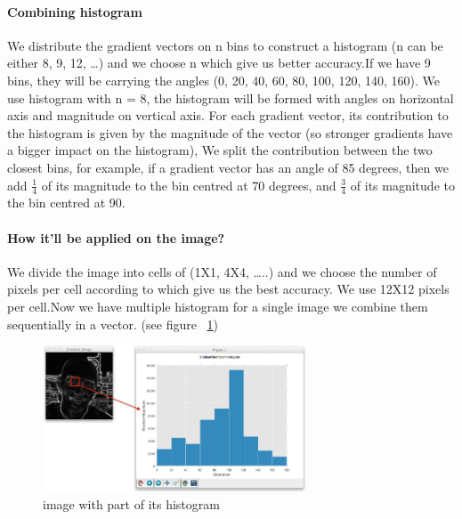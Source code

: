 \paragraph{Combining histogram}
We distribute the gradient vectors on n bins to construct a histogram (n can be either 8, 9, 12, …) and we choose n which give us better accuracy.\newline If we have 9 bins, they will be carrying the angles (0, 20, 40, 60, 80, 100, 120, 140, 160). \newline We use histogram with n = 8, the histogram will be formed with angles on horizontal axis and magnitude on vertical axis.
\newline For each gradient vector, its contribution to the histogram is given by the magnitude of the vector (so stronger gradients have a bigger impact on the histogram), We split the contribution between the two closest bins, for example, if a gradient vector has an angle of 85 degrees, then we add
\begin{math}
    \frac{1}{4}
\end{math} 
of its magnitude to the bin centred at 70 degrees, and 
\begin{math}
    \frac{3}{4} 
\end{math}
of its magnitude to the bin centred at 90.
\paragraph{How it’ll be applied on the image?}We divide the image into cells of (1X1, 4X4, …..) and we choose the number of pixels per cell according to which give us the best accuracy.\newline
We use 12X12 pixels per cell.\newline Now we have multiple histogram for a single image we combine them sequentially in a vector. (see figure ~\ref{fig:hist representation})
\begin{figure}
	\centering
	\includegraphics[width=0.7\textwidth]{images/histogram_ex.png}
	\caption{image with part of its histogram}
	\label{fig:hist representation}
\end{figure}
